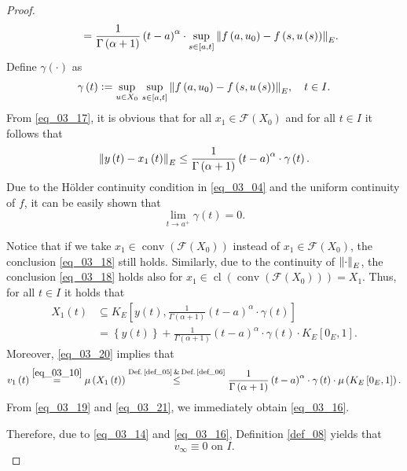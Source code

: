 \documentclass[reqno]{amsart}
\numberwithin{equation}{section}
\theoremstyle{definition}
\theoremstyle{remark}
\newcommand{\ball}[3]{K_{#1}\sbr{#2,#3}}
\newcommand{\br}[1]{\left(#1\right)}
\newcommand{\cbr}[1]{\left\{#1\right\}}
\newcommand{\cl}[1]{\clOperator\br{#1}}
\newcommand{\conv}[1]{\convOperator\br{#1}}
\newcommand{\defRef}[1]{\textrm{Def.\,\ref{#1}}}
\newcommand{\definitionRef}[1]{\textrm{Definition \ref{#1}}}
\newcommand{\defeq}{\vcentcolon=}
\newcommand{\eqText}[1]{\stackrel{#1}{=}}
\newcommand{\fF}{\mathcal{F}}
\newcommand{\leqText}[1]{\stackrel{#1}{\leq}}
\newcommand{\sbr}[1]{\left[#1\right]}
\DeclareMathOperator{\clOperator}{cl}
\DeclareMathOperator{\convOperator}{conv}
\begin{document}
\begin{proof}
\begin{equation}
\begin{aligned}
			&\qquad=\frac{1}{\Gamma\br{\alpha+1}}\br{t-a}^{\alpha}\cdot\sup_{s\in\sbr{a,t}}\norm{f\br{a,u_0}-f\br{s,u\br{s}}}_E.
		\end{aligned}
	\end{equation}
	Define $\gamma\br{\cdot}$ as
	\begin{equation*}
		\gamma\br{t}\defeq\sup_{u\in{X}_0}\,\sup_{s\in\sbr{a,t}}\norm{f\br{a,u_0}-f\br{s,u\br{s}}}_E,\quad{t}\in{I}.
	\end{equation*}
	From \eqref{eq_03_17}, it is obvious that for all ${x_1\in\fF\br{X_0}}$ and for all $t\in{I}$ it follows that
	\begin{equation}\label{eq_03_18}
		\norm{y\br{t}-x_1\br{t}}_E\leq\frac{1}{\Gamma\br{\alpha+1}}\br{t-a}^{\alpha}\cdot\gamma\br{t}.
	\end{equation}
	Due to the Hölder continuity condition in \eqref{eq_03_04} and the uniform continuity of $f$, it can be easily shown that
	\begin{equation}\label{eq_03_19}
		\lim_{t\rightarrow{a}^+}\gamma\br{t}=0.
	\end{equation}
	
	Notice that if we take $x_1\in\conv{\fF\br{X_0}}$ instead of $x_1\in\fF\br{X_0}$, the conclusion \eqref{eq_03_18} still holds. Similarly, due to the continuity of $\norm{\cdot}_E$, the conclusion \eqref{eq_03_18} holds also for $x_1\in\cl{\conv{\fF\br{X_0}}}=X_1$. Thus, for all $t\in{I}$ it holds that
	\begin{equation}\label{eq_03_20}
		\begin{aligned}
			X_1\br{t}&\subseteq\ball{E}{y\br{t}}{\frac{1}{\Gamma\br{\alpha+1}}\br{t-a}^{\alpha}\cdot\gamma\br{t}}\\
			&=\cbr{y\br{t}}+\frac{1}{\Gamma\br{\alpha+1}}\br{t-a}^\alpha\cdot\gamma\br{t}\cdot\ball{E}{0_E}{1}.
		\end{aligned}
	\end{equation}
	Moreover, \eqref{eq_03_20} implies that
	\begin{equation}\label{eq_03_21}
		v_1\br{t}\eqText{\eqref{eq_03_10}}\mu\br{X_1\br{t}}\leqText{\defRef{def_05}\,\&\,\defRef{def_06}}\frac{1}{\Gamma\br{\alpha+1}}\br{t-a}^{\alpha}\cdot\gamma\br{t}\cdot\mu\br{\ball{E}{0_E}{1}}.
	\end{equation}
	From \eqref{eq_03_19} and \eqref{eq_03_21}, we immediately obtain \eqref{eq_03_16}.
	
	Therefore, due to \eqref{eq_03_14} and \eqref{eq_03_16}, \definitionRef{def_08} yields that
	\begin{equation}\label{eq_03_22}
		v_{\infty}\equiv0\text{ on }I.
	\end{equation}
	

\end{proof}
\end{document}

